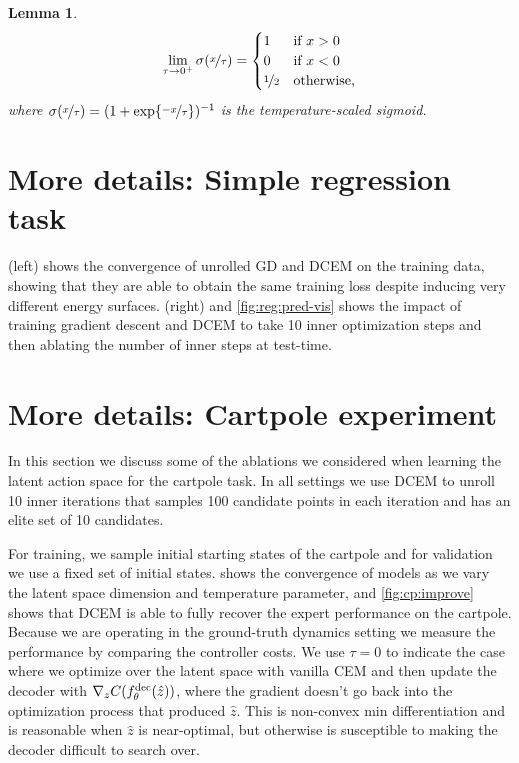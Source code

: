 \documentclass{article}
\newtheorem{lemma}{Lemma}
\begin{document}
\vspace{1cm}

\begin{lemma}
  \begin{equation}
    \lim_{\tau\rightarrow 0^+} \sigma(\nicefrac{x}{\tau}) =
    \begin{cases}
      1 & \text{if } x > 0 \\
      0 & \text{if } x < 0 \\
      \nicefrac{1}{2} & \text{otherwise,}
    \end{cases}
  \end{equation}
  where $\sigma(\nicefrac{x}{\tau})=(1+\exp\{\nicefrac{-x}{\tau}\})^{-1}$ is the
  temperature-scaled sigmoid.
  \label{lem:temp-sigmoid}
\end{lemma}

\section{More details: Simple regression task}
\label{app:reg}

 (left) shows the convergence of unrolled GD
and DCEM on the training data, showing that they are able
to obtain the same training loss despite inducing very
different energy surfaces.
 (right) and \cref{fig:reg:pred-vis}
shows the impact of training gradient descent and
DCEM to take 10 inner optimization steps and then
ablating the number of inner steps at test-time.

\section{More details: Cartpole experiment}
\label{app:cartpole}

In this section we discuss some of the ablations we considered
when learning the latent action space for the cartpole task.
In all settings we use DCEM to unroll 10 inner iterations
that samples 100 candidate points in each iteration and has
an elite set of 10 candidates.

For training, we sample initial starting states
of the cartpole and for validation we use a fixed set
of initial states.
 shows the convergence of
models as we vary the latent space dimension and
temperature parameter, and \cref{fig:cp:improve}
shows that DCEM is able to fully recover the
expert performance on the cartpole.
Because we are operating in the ground-truth dynamics
setting we measure the performance by comparing
the controller costs.
We use $\tau=0$ to indicate the case where we optimize
over the latent space with vanilla CEM and then
update the decoder with $\nabla_z C(f^{\mathrm{dec}}_\theta(\hat z))$,
where the gradient doesn't go back into the optimization
process that produced $\hat z$.
This is non-convex min differentiation and is reasonable
when $\hat z$ is near-optimal, but otherwise is susceptible
to making the decoder difficult to search over.
\end{document}
